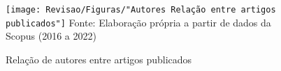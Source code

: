 \begin{figure}[H]
	\centering
	\caption{Relação de autores entre artigos publicados}
	\label{fig:autores-relacao-entre-artigos-publicados}
	\texttt{[image: Revisao/Figuras/"Autores Relação entre artigos publicados"]}
	\vspace{0.2cm}
	Fonte: Elaboração própria a partir de dados da Scopus (2016 a 2022)
\end{figure}